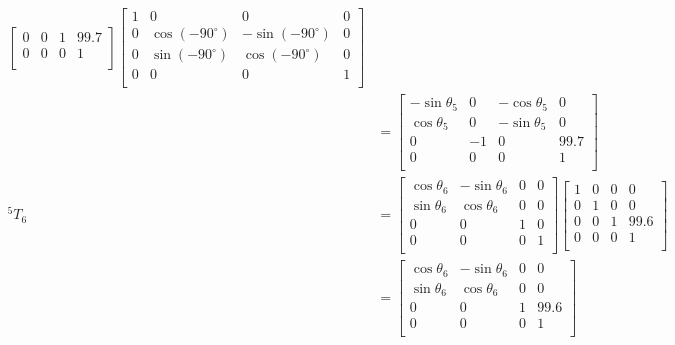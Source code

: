 \documentclass[UTF8, 12pt]{ctexart}
\begin{document}
\[\begin{aligned}
\begin{bmatrix}
        0 & 0 & 1 & 99.7 \\
        0 & 0 & 0 & 1 \\
        \end{bmatrix}
        \begin{bmatrix}
        1 & 0 & 0 & 0 \\
        0 & \cos(-90^\circ) & -\sin(-90^\circ) & 0 \\
        0 & \sin(-90^\circ) & \cos(-90^\circ) & 0 \\
        0 & 0 & 0 & 1 \\
        \end{bmatrix} \\
        &= \begin{bmatrix}
        -\sin\theta_5 & 0 & -\cos\theta_5 & 0 \\
        \cos\theta_5 & 0 & -\sin\theta_5 & 0 \\
        0 & -1 & 0 & 99.7 \\
        0 & 0 & 0 & 1 \\
        \end{bmatrix} \\
{}^5T_6 &= \begin{bmatrix}
        \cos\theta_6 & -\sin\theta_6 & 0 & 0 \\
        \sin\theta_6 & \cos\theta_6 & 0 & 0 \\
        0 & 0 & 1 & 0 \\
        0 & 0 & 0 & 1 \\
        \end{bmatrix}
        \begin{bmatrix}
        1 & 0 & 0 & 0 \\
        0 & 1 & 0 & 0 \\
        0 & 0 & 1 & 99.6 \\
        0 & 0 & 0 & 1 \\
        \end{bmatrix} \\
        &= \begin{bmatrix}
        \cos\theta_6 & -\sin\theta_6 & 0 & 0 \\
        \sin\theta_6 & \cos\theta_6 & 0 & 0 \\
        0 & 0 & 1 & 99.6 \\
        0 & 0 & 0 & 1 \\
        \end{bmatrix}
\end{aligned}
\]
\end{document}
